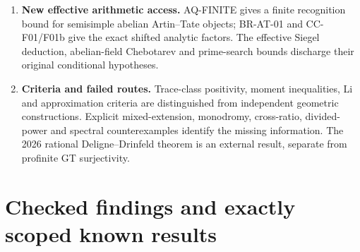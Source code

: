 \documentclass[11pt,a4paper]{article}
\theoremstyle{definition}\newtheorem{definition}[theorem]{Definition}
\theoremstyle{remark}\newtheorem{remark}[theorem]{Remark}
\begin{document}
\begin{enumerate}
inertia-invariant trace bounds. The universal stable curve has an explicit
geometric perverse decomposition, and its actual exit functor has the
proved right-Kan direct-image description. The linear theorem of cote
134-8 is established for all countable scalar rings, more generally
under a finite scalar pure-injective bound, or under either of two
finite-generation conditions, with the specified exact adjunction,
scalar compatibility and normalization retained. The unrestricted
large-ring case keeps its explicit counit gate.
\item \textbf{New effective arithmetic access.} AQ-FINITE gives a
finite recognition bound for semisimple abelian Artin--Tate objects;
BR-AT-01 and CC-F01/F01b give the exact shifted analytic factors.
The effective Siegel deduction, abelian-field Chebotarev and prime-search
bounds discharge their original conditional hypotheses.
\item \textbf{Criteria and failed routes.} Trace-class positivity,
moment inequalities, Li and approximation criteria are distinguished
from independent geometric constructions. Explicit mixed-extension,
monodromy, cross-ratio, divided-power and spectral counterexamples
identify the missing information. The 2026 rational Deligne--Drinfeld
theorem is an external result, separate from profinite GT surjectivity.
\end{enumerate}
\tableofcontents
\clearpage
\part{Checked findings and exactly scoped known results}
\end{document}
